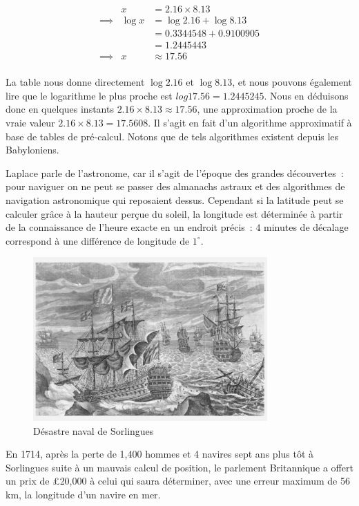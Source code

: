 \begin{eqnarray}
                    &x            &= 2.16\times{8.13}              \nonumber \\
        \implies{}  &\log{x}      &= \log{2.16}+\log{8.13}         \nonumber \\
                    &             &= 0.3344548 + 0.9100905         \nonumber \\
                    &             &= 1.2445443                     \nonumber \\
        \implies{}  &x            &\approx{17.56}                   \nonumber \\
\end{eqnarray}

La table nous donne directement $\log{2.16}$ et $\log{8.13}$, et nous pouvons également lire que le logarithme le plus proche est $log{17.56} = 1.2445245$. Nous en déduisons donc en quelques instants $2.16\times{8.13} \approx{17.56}$, une approximation proche de la vraie valeur $2.16\times{8.13}={17.5608}$. Il s'agit en fait d'un algorithme approximatif à base de tables de pré-calcul. Notons que de tels algorithmes existent depuis les Babyloniens\cite{robson-math}.

Laplace parle de l'astronome, car il s'agit de l'époque des grandes découvertes~: pour naviguer on ne peut se passer des almanachs astraux et des algorithmes de navigation astronomique qui reposaient dessus. Cependant si la latitude peut se calculer grâce à la hauteur perçue du soleil, la longitude est déterminée à partir de la connaissance de l'heure exacte en un endroit précis~: $4$ minutes de décalage correspond à une différence de longitude de $1^{\circ}$.  

\begin{minipage}[H]{0.59\linewidth}
  \begin{figure}[H]
  \centering
  \includegraphics[width=0.8\textwidth]{../resources/illustrations/scilly1707}
  \caption{Désastre naval de Sorlingues}
  \end{figure}
\end{minipage}
\begin{minipage}[H]{0.39\linewidth}
En 1714, après la perte de 1,400 hommes et 4 navires sept ans plus tôt à Sorlingues suite à un mauvais calcul de position, le parlement Britannique a offert un prix de \pounds{20,000} à celui qui saura déterminer, avec une erreur maximum de 56 km, la longitude d'un navire en mer\cite{longitude}. 
\end{minipage}

